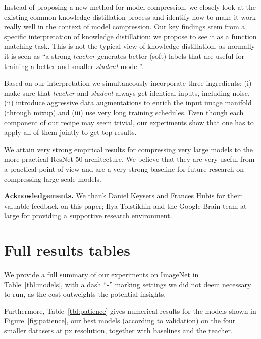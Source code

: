 \documentclass[10pt,twocolumn,letterpaper]{article}
\begin{document}
Instead of proposing a new method for model compression, we closely look at the existing common knowledge distillation process and identify how to make it work really well in the context of model compression. Our key findings stem from a specific interpretation of knowledge distillation: we propose to see it as a function matching task. This is not the typical view of knowledge distillation, as normally it is seen as ``a strong \emph{teacher} generates better (soft) labels that are useful for training a better and smaller \emph{student} model''.

Based on our interpretation we simultaneously incorporate three ingredients:  (i) make sure  that \emph{teacher} and \emph{student} always get identical inputs, including noise, (ii) introduce aggressive data augmentations to enrich the input image manifold (through mixup) and (iii) use very long training schedules. Even though each component of our recipe may seem trivial, our experiments show that one has to apply all of them jointly to get top results.

We attain very strong empirical results for compressing very large models to the more practical ResNet-50 architecture. We believe that they are very useful from a practical point of view and are a very strong baseline for future research on compressing large-scale models.

\textbf{Acknowledgements.} We thank Daniel Keysers and Frances Hubis for their valuable feedback on
this paper; Ilya Tolstikhin and the Google Brain team at large for providing a supportive research environment.

{\small


}

\clearpage{}
\appendix

\section{Full results tables}\label{sec:app:table}

We provide a full summary of our experiments on ImageNet in Table~\ref{tbl:models}, with a dash ``-'' marking settings we did not deem necessary to run, as the cost outweights the potential insights.

Furthermore, Table~\ref{tbl:patience} gives numerical results for the models shown in Figure~\ref{fig:patience}, our best models (according to validation) on the four smaller datasets at px resolution, together with baselines and the teacher.
\end{document}

